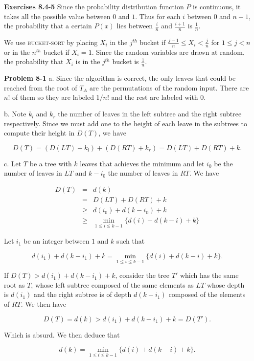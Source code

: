 \documentclass[a4paper,12pt]{article}
\newcommand{\newpar}[1]
{\bigskip \noindent \textbf{Exercises #1} \newline}
\newcommand{\newprob}[1]
{\bigskip \noindent \textbf{Problem #1} \newline}
\newcommand{\subpar}[1]{\medskip \noindent #1.}
\begin{document}
\newpar{8.4-5} Since the probability distribution function $P$ is
continuous, it takes all the possible value between $0$ and $1$.  Thus
for each $i$ between $0$ and $n-1$, the probability that a certain
$P(x)$ lies between $\frac{i}{n}$ and $\frac{i+1}{n}$ is
$\frac{1}{n}$.

We use \textsc{bucket-sort} by placing $X_i$ in the $j^{th}$ bucket if
$\frac{j-1}{n}\le X_i<\frac{j}{n}$ for $1\le j < n$ or in the $n^{th}$
bucket if $X_i = 1$.  Since the random variables are drawn at random,
the probability that $X_i$ is in the $j^{th}$ bucket is $\frac{1}{n}$.

\newprob{8-1} \subpar{a} Since the algorithm is correct, the only
leaves that could be reached from the root of $T_A$ are the
permutations of the random input.  There are $n!$ of them so they are
labeled $1/n!$ and the rest are labeled with $0$.

\subpar{b} Note $k_l$ and $k_r$ the number of leaves in the left
subtree and the right subtree respectively.  Since we must add one to
the height of each leave in the subtrees to compute their height in
$D(T)$, we have

\[ D(T) = (D(LT) + k_l) + (D(RT) + k_r) = D(LT) + D(RT) + k.\]

\subpar{c} Let $T$ be a tree with $k$ leaves that achieves the minimum
and let $i_0$ be the number of leaves in $LT$ and $k-i_0$ the number
of leaves in $RT$.  We have

\begin{eqnarray*}
  D(T) &=& d(k) \\
  &=& D(LT) + D(RT) + k \\
  &\ge& d(i_0) + d(k-i_0) + k \\
  &\ge& \min_{1\le i\le k-1}\{d(i) + d(k-i) +k\}
\end{eqnarray*}

Let $i_1$ be an integer between $1$ and $k$ such that

\[ d(i_1) + d(k-i_1) + k = \min_{1\le i\le k-1}\{d(i) + d(k-i) +k\}.\]

If $D(T) > d(i_1) + d(k-i_1) + k$, consider the tree $T'$ which has
the same root as $T$, whose left subtree composed of the same elements
as $LT$ whose depth is $d(i_1)$ and the right subtree is of depth
$d(k-i_1)$ composed of the elements of $RT$.  We then have

\[ D(T) = d(k) > d(i_1) + d(k-i_1) + k = D(T').\]

Which is absurd.  We then deduce that

\[ d(k) = \min_{1\le i\le k-1}\{d(i) + d(k-i) + k\}.\]
\end{document}

